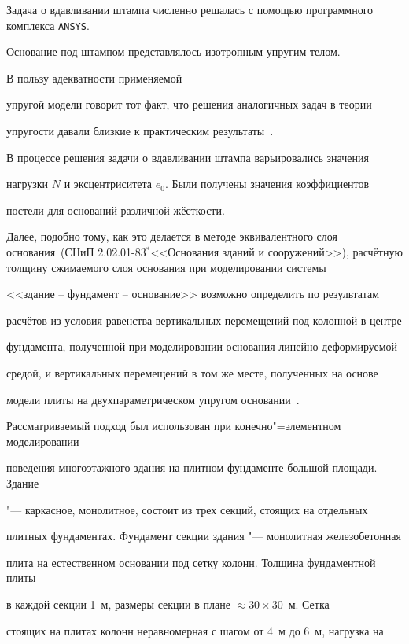 Задача о вдавливании штампа численно решалась с помощью программного комплекса {\tt ANSYS}. 

Основание под штампом представлялось изотропным упругим телом. 

В пользу адекватности применяемой

упругой модели говорит тот факт, что решения аналогичных задач в теории

упругости давали близкие к практическим результаты~\cite{gusev:bib4}.



В процессе решения задачи о вдавливании штампа варьировались значения

нагрузки $N$ и эксцентриситета $e_0$. Были получены значения коэффициентов

постели для оснований различной жёсткости.



Далее, подобно тому, как это делается в методе эквивалентного слоя основания~(СНиП 2.02.01-83$^{\ast }$<<Основания зданий и сооружений>>), расчётную толщину сжимаемого слоя основания при моделировании системы

<<здание -- фундамент -- основание>> возможно определить по результатам

расчётов из условия равенства вертикальных перемещений под колонной в центре

фундамента, полученной при моделировании основания линейно деформируемой

средой, и вертикальных перемещений в том же месте, полученных на основе

модели плиты на двухпараметрическом упругом основании~\cite{gusev:bib3}.



Рассматриваемый подход был использован при конечно"=элементном моделировании

поведения многоэтажного здания на плитном фундаменте большой площади. Здание

"--- каркасное, монолитное, состоит из трех секций, стоящих на отдельных

плитных фундаментах. Фундамент секции здания "--- монолитная железобетонная

плита на естественном основании под сетку колонн. Толщина фундаментной плиты

в каждой секции 1~м, размеры секции в плане $\approx 30\times 30$~м. Сетка

стоящих на плитах колонн неравномерная с шагом от 4~м до 6~м, нагрузка на

